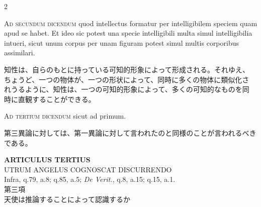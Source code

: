 \documentclass[paper=a4paper,fontsize=10pt,jafontsize=9pt,titlepage]{jlreq}
\begin{document}
\begin{paracol}{2}
\switchcolumn*

{\scshape Ad secundum dicendum} quod intellectus formatur per
intelligibilem speciem quam apud se habet. Et ideo sic potest una
specie intelligibili multa simul intelligibilia intueri, sicut unum
corpus per unam figuram potest simul multis corporibus assimilari.

\switchcolumn

知性は、自らのもとに持っている可知的形象によって形成される。それゆえ、
ちょうど、一つの物体が、一つの形状によって、同時に多くの物体に類似化さ
れうるように、知性は、一つの可知的形象によって、多くの可知的なものを同
時に直観することができる。

\switchcolumn*

{\scshape Ad tertium dicendum} sicut ad primum.

\switchcolumn

第三異論に対しては、第一異論に対して言われたのと同様のことが言われるべき
である。

\switchcolumn*

\end{paracol}
\newpage

\newpage
{}
{}
\setcounter{section}{3}
\setcounter{subsection}{0}
\begin{center}
{\Large {\bfseries ARTICULUS TERTIUS}}\\
{\large UTRUM ANGELUS COGNOSCAT DISCURRENDO}\\
{\footnotesize Infra, q.79, a.8; q.85, a.5; {\itshape De Verit.}, q.8,
a.15; q.15, a.1.}\\
{\Large 第三項\\天使は推論することによって認識するか}
\end{center}
\end{document}
